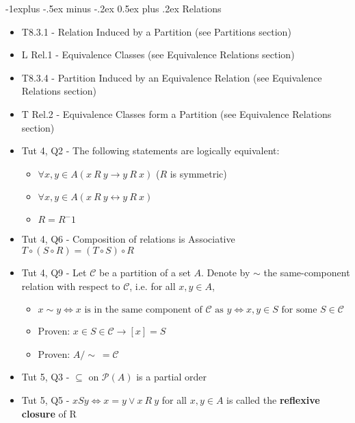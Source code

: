 \documentclass[10pt, landscape]{article}
\makeatletter
\renewcommand{\subsection}{\@startsection{subsection}{2}{0mm}%
                                {-1explus -.5ex minus -.2ex}%
                                {0.5ex plus .2ex}%
                                {\normalfont\normalsize\bfseries}}
\renewcommand{\bf}[1]{\textbf{#1}}
\let\iff\leftrightarrow
\let\then\rightarrow
\makeatother
\begin{document}
\begin{multicols}{3}
\begin{itemize}
    \end{itemize}

    \subsection{Relations}
    \begin{itemize}
        \item T8.3.1 -  Relation Induced by a Partition (see Partitions section)
        \item L Rel.1 - Equivalence Classes (see Equivalence Relations section)
        \item T8.3.4 - Partition Induced by an Equivalence Relation (see Equivalence Relations section)
        \item T Rel.2 - Equivalence Classes form a Partition (see Equivalence Relations section)
        \item Tut 4, Q2 - The following statements are logically equivalent:
        \begin{itemize}
            \item $\forall x, y \in A (x \ R \ y \then y \ R \ x)$ ($R$ is symmetric)
            \item $\forall x, y \in A (x \ R \ y \iff y \ R \ x)$
            \item $R = R^-1$
        \end{itemize}
        \item Tut 4, Q6 - Composition of relations is Associative
        \\ $T \circ (S \circ R) = (T \circ S) \circ R$
        \item Tut 4, Q9 - Let $\mathcal{C}$ be a partition of a set $A$. Denote by $\sim$ the same-component relation with respect to $\mathcal{C}$, i.e. for all $x,y \in A$,
        \begin{itemize}
            \item $x\sim y \Leftrightarrow x\text{ is in the same component of }\mathcal{C}\text{ as }y \Leftrightarrow x,y \in S \text{ for some } S \in \mathcal{C}$
            \item Proven: $x\in S \in \mathcal{C} \to [x]=S$
            \item Proven: $A/\sim \ =\mathcal{C}$
        \end{itemize}
        \item Tut 5, Q3 - $\subseteq$ on $\mathcal{P}(A)$ is a partial order
        \item Tut 5, Q5 - $x S y \Leftrightarrow x = y \lor x \ R \ y$ for all $x, y \in A$ is called the \bf{reflexive closure} of R

\end{itemize}
\end{multicols}
\end{document}
